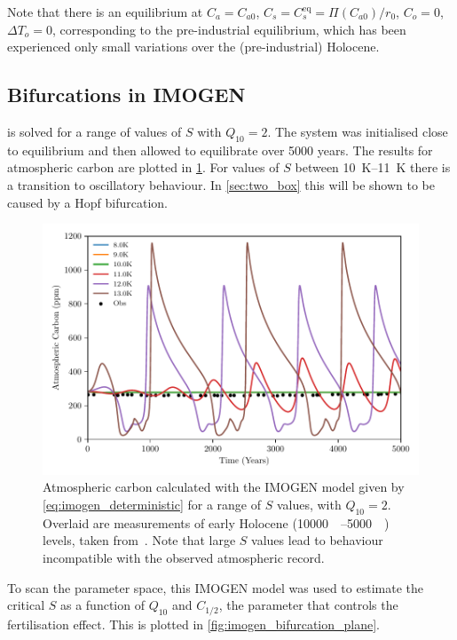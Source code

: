 Note that there is an equilibrium at $C_a = C_{a0}$, $C_s = C_s^{\mathrm{eq}} = \Pi(C_{a0})/r_0$, $C_o = 0$, $\Delta T_o = 0$, corresponding to the pre-industrial equilibrium, which has been
experienced only small variations over the (pre-industrial) Holocene.

\subsection{Bifurcations in IMOGEN}
 is solved for a range of values of $S$ with $Q_{10} = 2$. The system was initialised close to equilibrium and then allowed to equilibrate over 5000 years.
The results for atmospheric carbon are plotted in \cref{fig:imogen_trajectories}. For values of $S$ between \SIrange{10}{11}{\kelvin} there is a
transition to oscillatory behaviour. In \cref{sec:two_box} this will be shown to be caused by a Hopf bifurcation.
\begin{figure}
  \centering
  \includegraphics[width=\textwidth,keepaspectratio]{imogen_traj}
  \caption[Using IMOGEN to find the behaviour of atmospheric  for various values of $S$]{Atmospheric carbon calculated with the IMOGEN model
    given by \cref{eq:imogen_deterministic} for a range of $S$ values,
    with $Q_{10} = 2$. Overlaid are measurements of early Holocene (\SIrange{10000}{5000}{\year\beforepresent})  levels, taken from~\cite{Bereiter2015}.
  Note that large $S$ values lead to behaviour incompatible with the observed atmospheric  record.}
  \label{fig:imogen_trajectories}
\end{figure}

To scan the parameter space, this IMOGEN model was used to estimate the critical $S$ as a function of $Q_{10}$ and $C_{1/2}$,
the parameter that controls the  fertilisation effect. This is plotted in \cref{fig:imogen_bifurcation_plane}.

